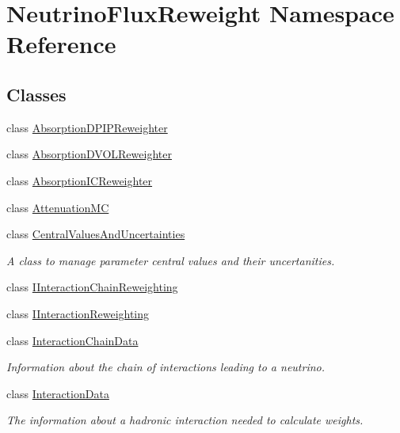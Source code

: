\hypertarget{namespace_neutrino_flux_reweight}{\section{Neutrino\-Flux\-Reweight Namespace Reference}
\label{namespace_neutrino_flux_reweight}
}
\subsection*{Classes}
\begin{DoxyCompactItemize}
\item 
class \hyperlink{class_neutrino_flux_reweight_1_1_absorption_d_p_i_p_reweighter}{Absorption\-D\-P\-I\-P\-Reweighter}
\item 
class \hyperlink{class_neutrino_flux_reweight_1_1_absorption_d_v_o_l_reweighter}{Absorption\-D\-V\-O\-L\-Reweighter}
\item 
class \hyperlink{class_neutrino_flux_reweight_1_1_absorption_i_c_reweighter}{Absorption\-I\-C\-Reweighter}
\item 
class \hyperlink{class_neutrino_flux_reweight_1_1_attenuation_m_c}{Attenuation\-M\-C}
\item 
class \hyperlink{class_neutrino_flux_reweight_1_1_central_values_and_uncertainties}{Central\-Values\-And\-Uncertainties}
\begin{DoxyCompactList}\small\item\em A class to manage parameter central values and their uncertanities. \end{DoxyCompactList}\item 
class \hyperlink{class_neutrino_flux_reweight_1_1_i_interaction_chain_reweighting}{I\-Interaction\-Chain\-Reweighting}
\item 
class \hyperlink{class_neutrino_flux_reweight_1_1_i_interaction_reweighting}{I\-Interaction\-Reweighting}
\item 
class \hyperlink{class_neutrino_flux_reweight_1_1_interaction_chain_data}{Interaction\-Chain\-Data}
\begin{DoxyCompactList}\small\item\em Information about the chain of interactions leading to a neutrino. \end{DoxyCompactList}\item 
class \hyperlink{class_neutrino_flux_reweight_1_1_interaction_data}{Interaction\-Data}
\begin{DoxyCompactList}\small\item\em The information about a hadronic interaction needed to calculate weights. \end{DoxyCompactList}\item 

\end{DoxyCompactItemize}
